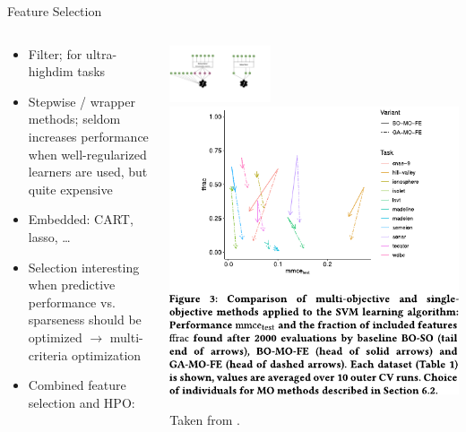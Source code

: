 \begin{frame}{Feature Selection}
    \begin{columns}
      \begin{column}{0.4\textwidth}
        \begin{itemize}
        
          \item Filter; for ultra-highdim tasks
          \item Stepwise / wrapper methods; 
          seldom increases performance when well-regularized 
              learners are used, but quite expensive 
          \item Embedded: CART, lasso, \ldots 
          \item Selection interesting when predictive performance vs. sparseness
              should be optimized $\rightarrow$ multi-criteria optimization
            \item Combined feature selection and HPO: 
            
        \end{itemize}
      \end{column}%
      \begin{column}{0.6\textwidth}
        \begin{center}
          \includegraphics[width=0.35\textwidth, trim=450 100 110 60, clip]{images/feat_extr_vs_selection.pdf}%
          \includegraphics[width=0.55\linewidth]{images/Binder2020multiobjective_fig3.pdf}


          {\tiny \hfill Taken from .}

        \end{center}
      \end{column}
    \end{columns}
    
\end{frame}

